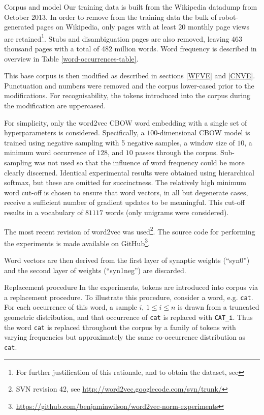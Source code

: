 \documentclass{article} %
\newcommand{\word}[1]{\texttt{#1}}
\begin{document}
\begin{section}{Corpus and model}\label{corpus-and-model}
Our training data is built from the Wikipedia datadump from October 2013.
In order to remove from the training data the bulk of robot-generated pages on Wikipedia, only pages with at least 20 monthly page views are retained\footnote{For further justification of this rationale, and to obtain the dataset, see \blogpost}.
Stubs and disambiguation pages are also removed, leaving 463 thousand pages with a total of 482 million words.
Word frequency is described in overview in Table \ref{word-occurrences-table}.

This base corpus is then modified as described in sections \ref{WFVE} and \ref{CNVE}.
Punctuation and numbers were removed and the corpus lower-cased prior to the modifications.
For recognisability, the tokens introduced into the corpus during the modification are uppercased.

For simplicity, only the word2vec CBOW word embedding with a single set of hyperparameters is considered.
Specifically, a $100$-dimensional CBOW model is trained using negative sampling with 5 negative samples, a window size of $10$, a minimum word occurrence of $128$, and $10$ passes through the corpus.
Sub-sampling was not used so that the influence of word frequency could be more clearly discerned.
Identical experimental results were obtained using hierarchical softmax, but these are omitted for succinctness.
The relatively high minimum word cut-off is chosen to ensure that word vectors, in all but degenerate cases, receive a sufficient number of gradient updates to be meaningful.
This cut-off results in a vocabulary of $81117$ words (only unigrams were considered).

The most recent revision of word2vec was used\footnote{SVN revision 42, see \url{http://word2vec.googlecode.com/svn/trunk/}}.
The source code for performing the experiments is made available on GitHub\footnote{\url{https://github.com/benjaminwilson/word2vec-norm-experiments}}.

Word vectors are then derived from the first layer of synaptic weights (``syn0'') and the second layer of weights (``syn1neg'') are discarded.

\begin{table}\label{word-occurrences-table}
	
	\caption{ Number of words, by frequency band, as observed in the unmodified corpus.  }
\end{table}

\begin{subsection}{Replacement procedure}\label{replacement-procedure}
In the experiments, tokens are introduced into corpus via a replacement procedure.
To illustrate this procedure, consider a word, e.g. \word{cat}.
For each occurrence of this word, a sample $i$, $1 \leqslant i \leqslant n$ is drawn from a truncated geometric distribution, and that occurrence of \word{cat} is replaced with \word{CAT\_i}.
Thus the word \word{cat} is replaced throughout the corpus by a family of tokens with varying frequencies but approximately the same co-occurrence distribution as \word{cat}.


\end{subsection}
\end{section}
\end{document}
